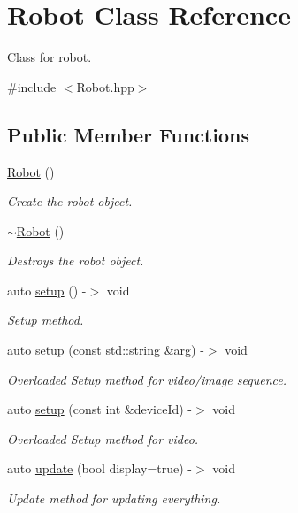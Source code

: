 \hypertarget{class_robot}{}\section{Robot Class Reference}
\label{class_robot}


Class for robot.  




{\ttfamily \#include $<$Robot.\+hpp$>$}

\subsection*{Public Member Functions}
\begin{DoxyCompactItemize}
\item 
\hyperlink{class_robot_a4fc7c70ae20623f05e06f2ecb388b6c4}{Robot} ()
\begin{DoxyCompactList}\small\item\em Create the robot object. \end{DoxyCompactList}\item 
\hyperlink{class_robot_a924320124b09c2f2ac1621aa210d5f38}{$\sim$\+Robot} ()
\begin{DoxyCompactList}\small\item\em Destroys the robot object. \end{DoxyCompactList}\item 
auto \hyperlink{class_robot_af43ba25439de328499e3d2f266e92592}{setup} () -\/$>$ void
\begin{DoxyCompactList}\small\item\em Setup method. \end{DoxyCompactList}\item 
auto \hyperlink{class_robot_a4d757fd25b06c57608c1d69f30581171}{setup} (const std\+::string \&arg) -\/$>$ void
\begin{DoxyCompactList}\small\item\em Overloaded Setup method for video/image sequence. \end{DoxyCompactList}\item 
auto \hyperlink{class_robot_a20e8d1137e9a7ebcf1fe1c3789e509e8}{setup} (const int \&device\+Id) -\/$>$ void
\begin{DoxyCompactList}\small\item\em Overloaded Setup method for video. \end{DoxyCompactList}\item 
auto \hyperlink{class_robot_aaec2f96af2ff3dc26c34535903c7baaf}{update} (bool display=true) -\/$>$ void
\begin{DoxyCompactList}\small\item\em Update method for updating everything. \end{DoxyCompactList}\end{DoxyCompactItemize}


